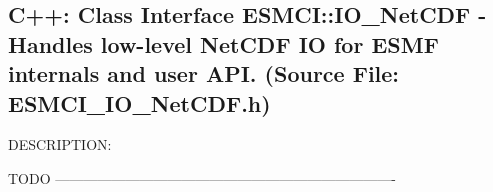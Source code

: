  
\setlength{\oldparskip}{\parskip}
\setlength{\parskip}{1.5ex}
\setlength{\oldparindent}{\parindent}
\setlength{\parindent}{0pt}
\setlength{\oldbaselineskip}{\baselineskip}
\setlength{\baselineskip}{11pt}
 
\def\bv{\begin{verbatim}}
\def\ev{\end{verbatim}}
\def\be{\begin{equation}}
\def\ee{\end{equation}}
\def\bea{\begin{eqnarray}}
\def\eea{\end{eqnarray}}
\def\bi{\begin{itemize}}
\def\ei{\end{itemize}}
\def\bn{\begin{enumerate}}
\def\en{\end{enumerate}}
\def\bd{\begin{description}}
\def\ed{\end{description}}
\def\({\left (}
\def\){\right )}
\def\[{\left [}
\def\]{\right ]}
\def\<{\left  \langle}
\def\>{\right \rangle}
\def\cI{{\cal I}}
\def\diag{\mathop{\rm diag}}
\def\tr{\mathop{\rm tr}}


 
\subsection{C++:  Class Interface ESMCI::IO\_NetCDF - Handles low-level NetCDF IO for ESMF internals and user API. (Source File: ESMCI\_IO\_NetCDF.h)}


  
{\sf DESCRIPTION:\\ }


    TODO
  -------------------------------------------------------------------------
  
